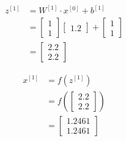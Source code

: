 \documentclass[12pt]{article}
\begin{document}
\begin{enumerate}[leftmargin=\labelsep]
\begin{paracol}{3}
              $$
                  \begin{aligned}
                      z^{[1]} & = W^{[1]} \cdot x^{[0]} + b^{[1]} \\
                              & = \begin{bmatrix}
                                      1 \\
                                      1
                                  \end{bmatrix}
                      \begin{bmatrix}
                          1.2
                      \end{bmatrix}
                      +
                      \begin{bmatrix}
                          1 \\
                          1
                      \end{bmatrix}                              \\
                              & = \begin{bmatrix}{}
                                      2.2 \\
                                      2.2
                                  \end{bmatrix}
                  \end{aligned}
              $$

              $$
                  \begin{aligned}
                      x^{[1]} & = f(z^{[1]})                  \\
                              & = f\left(\begin{bmatrix}{}
                                                 2.2 \\
                                                 2.2
                                             \end{bmatrix}\right) \\
                              & = \begin{bmatrix}{}
                                      1.2461 \\
                                      1.2461
                                  \end{bmatrix}
                  \end{aligned}
              $$


\end{paracol}
\end{enumerate}
\end{document}
